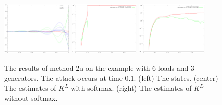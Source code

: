 \documentclass{article}
\begin{document}
\begin{figure}
\includegraphics[width=0.3\textwidth]{method2a/example1-states}
\includegraphics[width=0.3\textwidth]{method2a/example1-K_L}
\includegraphics[width=0.3\textwidth]{method2a/example1-K_L-raw}
\caption{
    The results of method 2a on the example with 6 loads and 3 generators.
    The attack occurs at time 0.1.
    (left) The states.
    (center) The estimates of $K^L$ with softmax.
    (right) The estimates of $K^L$ without softmax.
}
\end{figure}
\end{document}
